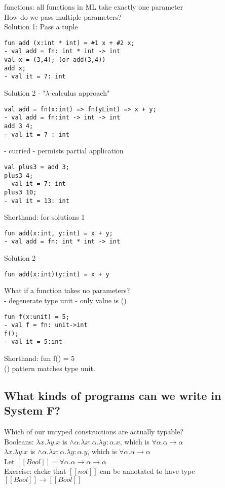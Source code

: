 \documentclass[11pt]{article}
\begin{document}
functions: all functions in ML take exactly one parameter \\

How do we pass multiple parameters? \\

Solution 1: Pass a tuple
\begin{verbatim}
fun add (x:int * int) = #1 x + #2 x;
- val add = fn: int * int -> int
val x = (3,4); (or add(3,4))
add x;
- val it = 7: int
\end{verbatim}

Solution 2 - "$\lambda$-calculus approach" 
\begin{verbatim}
val add = fn(x:int) => fn(yLint) => x + y;
- val add = fn:int -> int -> int
add 3 4;
- val it = 7 : int
\end{verbatim}

- curried - permists partial application
\begin{verbatim}
val plus3 = add 3;
plus3 4;
- val it = 7: int
plus3 10;
- val it = 13: int
\end{verbatim}

Shorthand: for solutions 1
\begin{verbatim}
fun add(x:int, y:int) = x + y;
- val add = fn: int * int -> int
\end{verbatim}

Solution 2
\begin{verbatim}
fun add(x:int)(y:int) = x + y
\end{verbatim}

What if a function takes no parameters?  \\

- degenerate type unit - only value is ()

\begin{verbatim}
fun f(x:unit) = 5;
- val f = fn: unit->int
f();
- val it = 5:int
\end{verbatim}

Shorthand: fun f() = 5 \\

() pattern matches type unit. \\

\subsection{What kinds of programs can we write in System F?}

Which of our untyped constructions are actually typable? \\

Booleans: $\lambda x.\lambda y.x$ is $\land \alpha. \lambda x:\alpha.\lambda y: \alpha.x$, which is $\forall \alpha.\alpha \rightarrow \alpha$ \\

$\lambda x.\lambda y.x$ is $\land \alpha. \lambda x:\alpha.\lambda y: \alpha.y$, which is $\forall \alpha.\alpha \rightarrow \alpha$ \\

Let $[[Bool]] = \forall \alpha.\alpha \rightarrow \alpha \rightarrow \alpha$ \\

Exercise: chekc that $[[not]]$ can be annotated to have type $[[Bool]] \rightarrow [[Bool]]$
\end{document}
